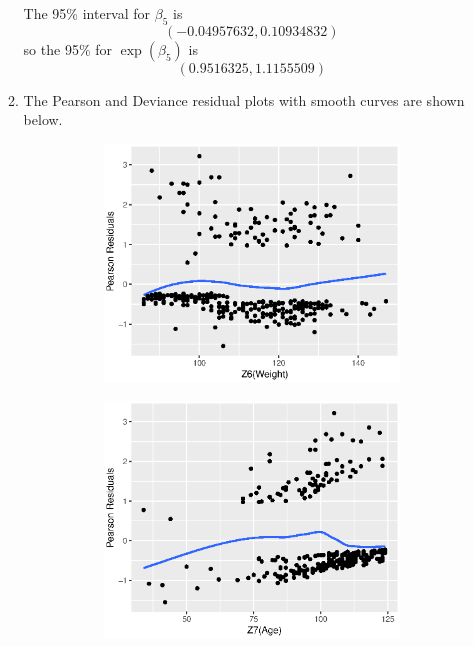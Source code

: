 \documentclass{article}
\begin{document}
\begin{enumerate}[leftmargin = 0 em, label = \arabic*., font = \bfseries]
\begin{enumerate}
		The 95\% interval for $\beta_5$ is
		\[(-0.04957632,  0.10934832)\]
		so the 95\% for $\exp(\beta_5)$ is
		\[(0.9516325, 1.1155509)\]

\newpage
		\item The Pearson and Deviance residual plots with smooth curves are shown below.
		\begin{figure}[!htb]
		\centering
			\begin{subfigure}[b]{0.3\textwidth}
			\includegraphics[width = \textwidth]{pz6.eps}
			\end{subfigure}%
			\begin{subfigure}[b]{0.3\textwidth}
			\includegraphics[width = \textwidth]{pz7.eps}

\end{subfigure}
\end{figure}
\end{enumerate}
\end{enumerate}
\end{document}
